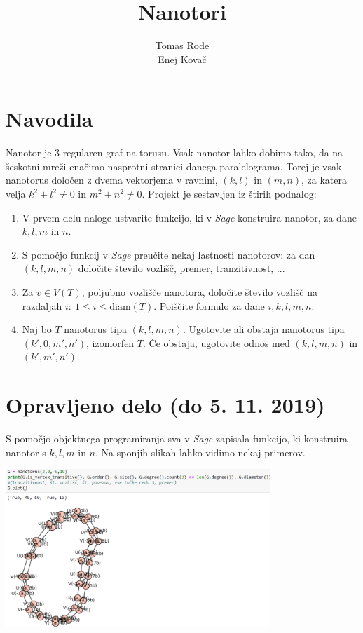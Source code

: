 \documentclass[a4paper, 11 pt]{article}
\title{Nanotori}
\author{Tomas Rode \\ Enej Kovač}
\begin{document}
\maketitle

\section{Navodila}

Nanotor je 3-regularen graf na torusu. Vsak nanotor lahko dobimo tako, da na šeskotni mreži enačimo nasprotni stranici danega paralelograma. Torej je vsak nanotorus določen z dvema vektorjema v ravnini, $(k,l)$ in $(m, n)$, za katera velja $k^2 + l^2 \neq 0$ in $m^2 + n^2 \neq 0$. Projekt je sestavljen iz štirih podnalog:

\begin{enumerate}
  \item V prvem delu naloge ustvarite funkcijo, ki v \textit{Sage} konstruira nanotor, za dane $k, l, m$ in $n$.
  \item S pomočjo funkcij v \textit{Sage} preučite nekaj lastnosti nanotorov: za dan $(k, l, m, n)$ določite število vozlišč, premer, tranzitivnost, ...
  \item Za $v \in V(T)$, poljubno vozlišče nanotora, določite število vozlišč na razdaljah $i:\ 1 \leq i \leq \textrm{diam}(T)$. Poiščite formulo za dane $i, k, l, m, n$.
  \item Naj bo $T$ nanotorus tipa $(k, l, m, n)$. Ugotovite ali obstaja nanotorus tipa $(k', 0, m', n')$, izomorfen $T$. Če obstaja, ugotovite odnos med $(k, l, m, n)$ in $(k', m', n')$.
\end{enumerate}

\section{Opravljeno delo (do 5. 11. 2019)}

S pomočjo objektnega programiranja sva v \textit{Sage} zapisala funkcijo, ki konstruira nanotor s $k, l, m$ in $n$. Na sponjih slikah lahko vidimo nekaj primerov.

\begin{center}
\includegraphics[width=10cm]{nano2}
\end{center}
\vspace{1cm}
\end{document}
